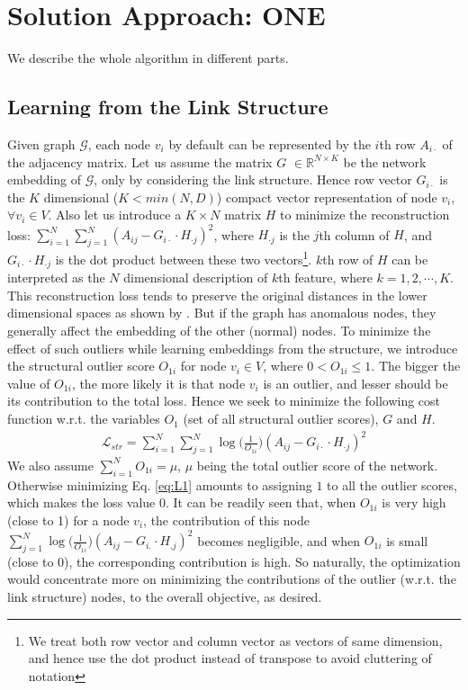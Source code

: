 \documentclass[letterpaper]{article} %
\begin{document}
\section{Solution Approach: ONE}
We describe the whole algorithm in different parts.
\subsection{Learning from the Link Structure}
Given graph $\mathcal{G}$, each node $v_i$ by default can be represented by the $i$th row $A_{i\cdot}$ of the adjacency matrix. Let us assume the matrix $G$ $\in \mathbb{R}^{N \times K}$ be the network embedding of $\mathcal{G}$, only by considering the link structure. Hence row vector $G_{i\cdot}$ is the $K$ dimensional ($K < min(N,D)$) compact vector representation of node $v_i$, $\forall v_i \in V$. Also let us introduce a $K \times N$ matrix $H$ to minimize the reconstruction loss: $\sum\limits_{i=1}^N\sum\limits_{j=1}^N (A_{ij} - G_{i\cdot} \cdot H_{\cdot j})^2$, where $H_{\cdot j}$ is the $j$th column of $H$, and $G_{i\cdot} \cdot H_{\cdot j}$ is the dot product between these two vectors\footnote[1]{We treat both row vector and column vector as vectors of same dimension, and hence use the dot product instead of transpose to avoid  cluttering of notation}. $k$th row of $H$ can be interpreted as the $N$ dimensional description of $k$th feature, where $k = 1,2,\cdots,K$. This reconstruction loss tends to preserve the original distances in the lower dimensional spaces as shown by \cite{cunningham2015}. But if the graph has anomalous nodes, they generally affect the embedding of the other (normal) nodes. To minimize the effect of such outliers while learning embeddings from the structure, we introduce the structural outlier score $O_{1i}$ for node $v_i \in V$, where $0 < O_{1i} \leq 1$. The bigger the value of $O_{1i}$, the more likely it is that node $v_i$ is an outlier, and lesser should be its contribution to the total loss. Hence we seek to minimize the following cost function w.r.t. the variables $O_1$ (set of all structural outlier scores), $G$ and $H$.
\begin{align}\label{eq:L1}
\mathcal{L}_{str} = \sum_{i=1}^N\sum_{j=1}^N\log\Big({\frac{1}{O_{1i}}}\Big) (A_{ij} - G_{i\cdot} \cdot H_{\cdot j})^2
\end{align}
We also assume $\sum\limits_{i=1}^N O_{1i} = \mu$, $\mu$ being the total outlier score of the network. Otherwise minimizing Eq.
\ref{eq:L1} amounts to assigning $1$ to all the outlier scores, which makes the loss value 0. It can be readily seen that, when $O_{1i}$ is very high (close to 1) for a node $v_i$, the contribution of this node $\sum\limits_{j=1}^N\log\Big({\frac{1}{O_{1i}}}\Big) (A_{ij} - G_{i.} \cdot H_{.j})^2$ becomes negligible, and when $O_{1i}$ is small (close to 0), the corresponding contribution is high. So naturally, the optimization would concentrate more on minimizing the contributions of the outlier (w.r.t. the link structure) nodes, to the overall objective, as desired.
\end{document}
